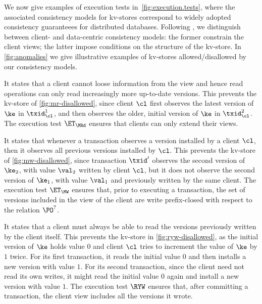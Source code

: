 


We now give examples of execution tests in~\cref{fig:execution.tests},
where the associated consistency models for kv-stores correspond to
widely adopted consistency guaranteees for distributed databases.
Following \cite{distrprinciples}, we distinguish between
client- and data-centric consistency models: 
the former constrain the client views; 
the latter impose conditions on the structure of the kv-store.  
In \cref{fig:anomalies} we give illustrative
examples of kv-stores allowed/disallowed by our
consistency models.

It states that a client cannot loose information from the view and 
hence read operations can only read increasingly more up-to-date versions. 
This prevents \eg the kv-store of \cref{fig:mr-disallowed},
since client $\cl$ first observes the latest version of $\ke$ in $\txid_{\cl}^{1}$, 
and then observes the older, initial version of $\ke$ in $\txid_{\cl}^{2}$.  
The execution test $\ET_{\MRd}$ ensures that clients  can only extend their views. 

It states that whenever a transaction observes a version installed by a client $\cl$,
then it observes all previous versions installed by $\cl$. 
This prevents \eg the kv-store of \cref{fig:mw-disallowed}, since 
transaction $\txid'$ observes the second version of $\ke_2$, 
with value $\val_2$ written by client $\cl$, 
but it does not observe the second version of $\ke_1$, 
with value $\val_1$ and previously written by the same client.
The execution test $\ET_{\MW}$  ensures that, prior to executing a transaction,
the set of versions included in the view of the client are write 
prefix-closed with respect to the relation $\PO^?$.

It states that a client must always be able to read the versions previously written by the client itself.
This prevents the kv-store in \cref{fig:ryw-disallowed}, 
as the initial version of $\ke$ holds value $0$ 
and client $\cl$ tries to increment the value of $\ke$ by $1$ twice.  
For its first transaction, it reads the initial value $0$ and then installs  a new version with value $1$. 
For its second transaction, since the client need not read its own writes, 
it might read the initial value $0$ again and install a new version with value $1$.
The execution test $\RYW$ ensures that, after committing a transaction, 
the client view includes all the versions it wrote.  

